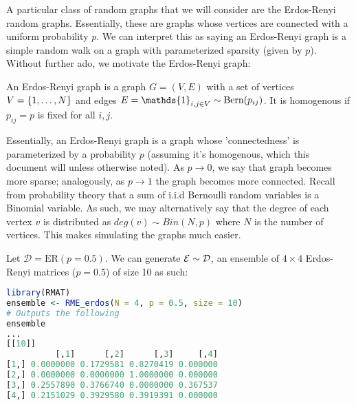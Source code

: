A particular class of random graphs that we will consider are the Erdos-Renyi random graphs. Essentially, these are graphs whose vertices are connected with a uniform probability $p$. We can interpret this as saying an Erdos-Renyi graph is a simple random walk on a graph with parameterized sparsity (given by $p$). Without further ado, we motivate the Erdos-Renyi graph:

\begin{definition}
An Erdos-Renyi graph is a graph $G = (V,E)$ with a set of vertices $V = \{\oneto[N]\}$ and edges $E = \mathds{1}_{i,j \in V} \sim \Bern(p_{ij})$. It is homogenous if $p_{ij} = p$ is fixed for all $i, j$.
\end{definition}

Essentially, an Erdos-Renyi graph is a graph whose 'connectedness' is parameterized by a probability $p$ (assuming it's homogenous, which this document will unless otherwise noted). As $p \to 0$, we say that graph becomes more sparse; analogously, as $p \to 1$ the graph becomes more connected.\newline
\indent Recall from probability theory that a sum of i.i.d Bernoulli random variables is a Binomial variable. As such, we may alternatively say that the degree of each vertex $v$ is distributed as $deg(v) \sim Bin(N,p)$ where $N$ is the number of vertices. This makes simulating the graphs much easier.

\begin{code}[Erdos-Renyi p = 0.5 Ensemble]
Let $\mathcal{D} = \text{ER}(p = 0.5)$. We can generate $\Ens \sim \D$, an ensemble of $4 \times 4$ Erdos-Renyi matrices ($p = 0.5$) of size 10 as such:
\end{code}

\begin{lstlisting}[language=R]
library(RMAT)
ensemble <- RME_erdos(N = 4, p = 0.5, size = 10)
# Outputs the following
ensemble
...
[[10]]
          [,1]      [,2]      [,3]     [,4]
[1,] 0.0000000 0.1729581 0.8270419 0.000000
[2,] 0.0000000 0.0000000 1.0000000 0.000000
[3,] 0.2557890 0.3766740 0.0000000 0.367537
[4,] 0.2151029 0.3929580 0.3919391 0.000000
\end{lstlisting}


